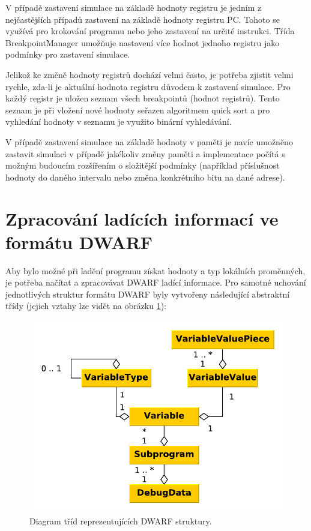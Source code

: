 V případě zastavení simulace na základě hodnoty registru je jedním z nejčastějších případů zastavení na základě hodnoty registru PC. Tohoto se využívá pro krokování programu nebo jeho zastavení na určité instrukci. Třída BreakpointManager umožňuje nastavení více hodnot jednoho registru jako podmínky pro zastavení simulace. 

Jelikož ke změně hodnoty registrů dochází velmi často, je potřeba zjistit velmi rychle, zda-li je aktuální hodnota registru důvodem k zastavení simulace. Pro každý registr je uložen seznam všech breakpointů (hodnot registrů). Tento seznam je při vložení nové hodnoty seřazen algoritmem quick sort a pro vyhledání hodnoty v seznamu je využito binární vyhledávání.

V případě zastavení simulace na základě hodnoty v paměti je navíc umožněno zastavit simulaci v případě jakékoliv změny paměti a implementace počítá s možným budoucím rozšířením o složitější podmínky (například příslušnost hodnoty do daného intervalu nebo změna konkrétního bitu na dané adrese).

\section{Zpracování ladících informací ve formátu DWARF}
\label{label_dwarf}

Aby bylo možné při ladění programu získat hodnoty a typ lokálních proměnných, je potřeba načítat a zpracovávat DWARF ladící informace. Pro samotné uchování jednotlivých struktur formátu DWARF byly vytvořeny následující abstraktní třídy (jejich vztahy lze vidět na obrázku \ref{fig:dwarf_classes}):

\begin{figure}[h]
\centering
\includegraphics[trim=0cm 0cm 0cm 0cm, scale=0.7]{fig/dwarf_impl}
\caption{Diagram tříd reprezentujících DWARF struktury.}
\label{fig:dwarf_classes}
\end{figure}

